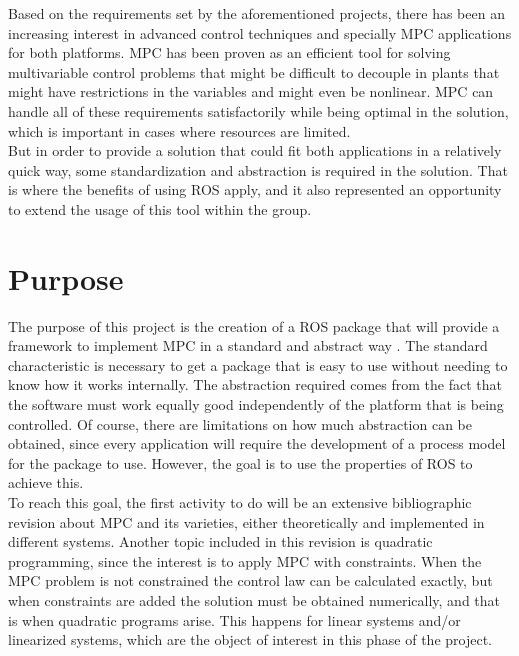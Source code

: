 Based on the requirements set by the aforementioned projects, there has been an increasing interest in advanced control techniques and specially MPC applications for both platforms. MPC has been proven as an efficient tool for solving multivariable control problems that might be difficult to decouple in plants that might have restrictions in the variables and might even be nonlinear. MPC can handle all of these requirements satisfactorily while being optimal in the solution, which is important in cases where resources are limited.\\




But in order to provide a solution that could fit both applications in a relatively quick way, some standardization and abstraction is required in the solution. That is where the benefits of using ROS apply, and it also represented an opportunity to extend the usage of this tool within the group.


\section{Purpose}

The purpose of this project is the creation of a ROS package that will provide a framework to implement MPC in a standard and abstract way . The standard characteristic is necessary to get a package that is easy to use without needing to know how it works internally. The abstraction required comes from the fact that the software must work equally good independently of the platform that is being controlled. Of course, there are limitations on how much abstraction can be obtained, since every application will require the development of a process model for the package to use. However, the goal is to use the properties of ROS to achieve this.\\

To reach this goal, the first activity to do will be an extensive bibliographic revision about MPC and its varieties, either theoretically and implemented in different systems. Another topic included in this revision is quadratic programming, since the interest is to apply MPC with constraints. When the MPC problem is not constrained the control law can be calculated exactly, but when constraints are added the solution must be obtained numerically, and that is when quadratic programs arise. This happens for linear systems and/or linearized systems, which are the object of interest in this phase of the project.\\

